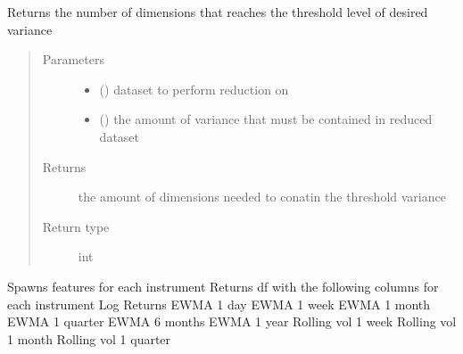 \documentclass[letterpaper,10pt,english]{sphinxmanual}
\begin{document}
\begin{fulllineitems}
\label{\detokenize{index:Src.preprocessing.dimension_selector}}
Returns the number of dimensions that reaches the
threshold level of desired variance
\begin{quote}\begin{description}
\item[{Parameters}] \leavevmode\begin{itemize}
\item {} 
 () \textendash{} dataset to perform reduction on

\item {} 
 () \textendash{} the amount of variance that must be contained in reduced dataset

\end{itemize}

\item[{Returns}] \leavevmode
the amount of dimensions needed to conatin the threshold variance

\item[{Return type}] \leavevmode
int

\end{description}\end{quote}

\end{fulllineitems}


\begin{fulllineitems}
\label{\detokenize{index:Src.preprocessing.feature_spawn}}
Spawns features for each instrument
Returns df with the following columns for each
instrument
Log Returns
EWMA 1 day
EWMA 1 week
EWMA 1 month
EWMA 1 quarter
EWMA 6 months
EWMA 1 year
Rolling vol 1 week
Rolling vol 1 month
Rolling vol 1 quarter

\end{fulllineitems}

\end{document}
